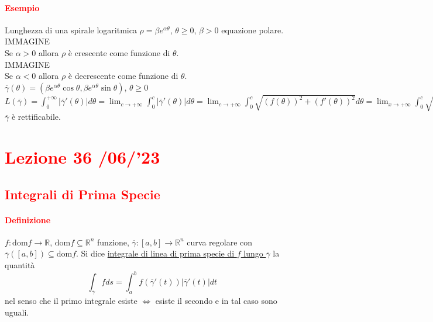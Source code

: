 \documentclass{article}
\newcommand{\R}{\mathbb{R}}
\newcommand{\dom}{\text{dom}}
\begin{document}
\paragraph{\textcolor{red}{Esempio}}
Lunghezza di una spirale logaritmica $\rho=\beta e^{\alpha\theta}$, $\theta \geq 0$, $\beta >0$ equazione polare.\\
IMMAGINE\\
Se $\alpha >0$ allora $\rho$ è crescente come funzione di $\theta$.\\
IMMAGINE\\
Se $\alpha<0$ allora $\rho$ è decrescente come funzione di $\theta$.\\
$\overline{\gamma}(\theta)=(\beta e^{\alpha\theta}\cos \theta, \beta e^{\alpha\theta}\sin\theta)$, $\theta \geq 0$\\
$L(\overline{\gamma})=\int_{0}^{+\infty} |\overline{\gamma}'(\theta)|d\theta=\lim_{c \rightarrow +\infty}\int_0^c |\overline{\gamma}'(\theta)|d\theta= \lim_{c \rightarrow + \infty}\int_{0}^c \sqrt{(f(\theta))^2+(f'(\theta))^2}d\theta=\lim_{x \rightarrow +\infty} \int_0^c \sqrt{\beta^2e^{2\alpha \theta}+\beta^2\alpha^2e^{2\alpha \theta}}d\theta= \lim_{c \rightarrow +\infty} \int_{0}^{c}\beta \sqrt{1+\alpha^2}e^{\alpha\theta}= -\frac{\beta}{\alpha}\sqrt{1+\alpha^2}=\beta \sqrt{\frac{1+\alpha^2}{\alpha^2}}< + \infty$\\
$\overline{\gamma}$ è rettificabile.\\

\newpage
\section{\textcolor{red}{Lezione 36 \space{}/06/'23}}
\subsection{\textcolor{red}{Integrali di Prima Specie}}
\paragraph{\textcolor{red}{Definizione}}
$f:\dom f \rightarrow \R$, $\dom f \subseteq \R^n$ funzione, $\overline{\gamma}:[a,b]\rightarrow \R^n$ curva regolare con $\overline{\gamma}([a,b])\subseteq \dom f$. Si dice \underline{integrale di linea di prima specie di $f$ lungo $\overline{\gamma}$} la quantità
\begin{equation*}
    \int_{\overline{\gamma}}f ds = \int_a^bf(\overline{\gamma}'(t))|\overline{\gamma}'(t)|dt
\end{equation*}
nel senso che il primo integrale esiste $\Leftrightarrow$ esiste il secondo e in tal caso sono uguali.
\end{document}

